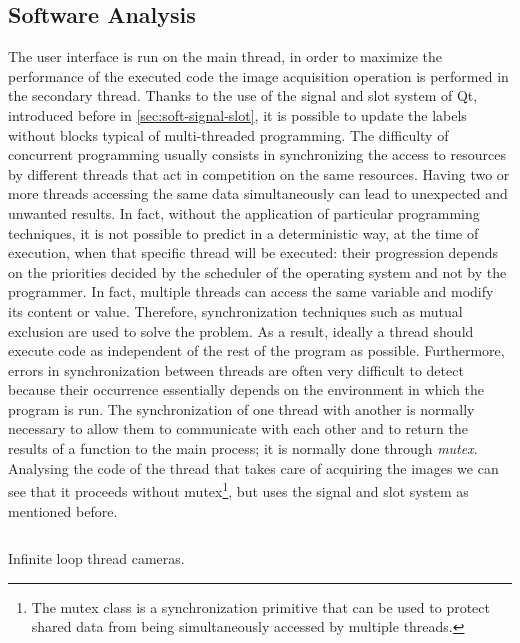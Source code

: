 \subsection{Software Analysis}
\label{ssec:raspberry-softw-analysis}
The user interface is run on the main thread, in order to maximize the
performance of the executed code the image acquisition operation is performed in
the secondary thread. Thanks to the use of the signal and slot system of Qt, 
introduced before in \ref{sec:soft-signal-slot}, it is possible to update the 
labels without blocks typical of multi-threaded programming. 
The difficulty of concurrent programming usually consists in
synchronizing the access to resources by different threads that act in
competition on the same resources. Having two or more threads accessing the same
data simultaneously can lead to unexpected and unwanted results. 
In fact, without the application of particular programming techniques, it is not
possible to predict in a deterministic way, at the time of execution, when that
specific thread will be executed: their progression depends on the priorities
decided by the scheduler of the operating system and not by the programmer. 
In fact, multiple threads can access the same variable and modify its content or
value. Therefore, synchronization techniques such as mutual exclusion are used
to solve the problem. As a result, ideally a thread should execute code as
independent of the rest of the program as possible. Furthermore, errors in
synchronization between threads are often very difficult to detect because their
occurrence essentially depends on the environment in which the program is run.
The synchronization of one thread with another is normally necessary to allow
them to communicate with each other and to return the results of a function to
the main process; it is normally done through \emph{mutex}\cite{wiki:thread}.
Analysing the code of the thread that takes care of acquiring the images we can 
see that it proceeds without mutex\footnote{The mutex class is a synchronization
primitive that can be used to protect shared data from being simultaneously
accessed by multiple threads.}, but uses the signal and slot system as mentioned
before.
%
\begin{listing}[ht]
\inputminted[bgcolor=bg,frame=lines,framesep=2mm, linenos=true, autogobble, breaklines=true, fontsize=\scriptsize, firstline=36, lastline=100]{c++}{software/code/leptonthread.cpp} 
\caption{Infinite loop thread cameras.}
\label{lst:rasp-leptonthread}
\end{listing}
